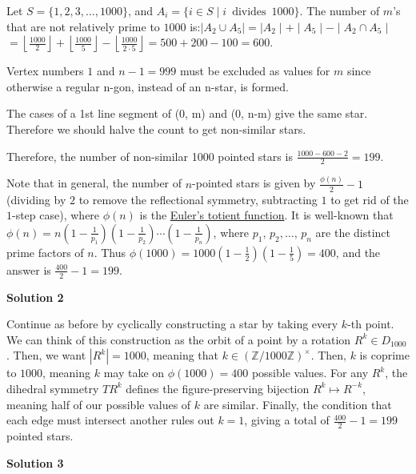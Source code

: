 \begin{enumerate}
 Let $S = \{1,2,3,\ldots, 1000\}$, and $A_{i}= \{i \in S \mid i\, \textrm{ divides }\,1000\}$. The number of $m$'s that are not relatively prime to $1000$ is:$\mid A_{2}\cup A_{5}\mid = \mid A_{2}\mid+\mid A_{5}\mid-\mid A_{2}\cap A_{5}\mid$$= \left\lfloor \frac{1000}{2}\right\rfloor+\left\lfloor \frac{1000}{5}\right\rfloor-\left\lfloor \frac{1000}{2 \cdot 5}\right\rfloor$$= 500+200-100 = 600.$

 Vertex numbers $1$ and $n-1=999$ must be excluded as values for $m$ since otherwise a regular n-gon, instead of an n-star, is formed.

 The cases of a 1st line segment of (0, m) and (0, n-m) give the same star. Therefore we should halve the count to get non-similar stars.

 Therefore, the number of non-similar 1000 pointed stars is $\frac{1000-600-2}{2}= \boxed{199}.$

 Note that in general, the number of $n$-pointed stars is given by $\frac{\phi(n)}{2} - 1$ (dividing by $2$ to remove the reflectional symmetry, subtracting $1$ to get rid of the $1$-step case), where $\phi(n)$ is the \href{https://artofproblemsolving.com/wiki/index.php?title=Euler\%27s\_totient\_function}{Euler's totient function}. It is well-known that $\phi(n) = n\left(1-\frac{1}{p_1}\right)\left(1-\frac{1}{p_2}\right)\cdots \left(1-\frac{1}{p_n}\right)$, where $p_1,\,p_2,\ldots,\,p_n$ are the distinct prime factors of $n$. Thus $\phi(1000) = 1000\left(1 - \frac 12\right)\left(1 - \frac 15\right) = 400$, and the answer is $\frac{400}{2} - 1 = 199$.

 



\textbf{Solution 2}

Continue as before by cyclically constructing a star by taking every $k$-th point. We can think of this construction as the orbit of a point by a rotation $R^k\in D_{1000}$. Then, we want $|R^k|=1000$, meaning that $k\in (\mathbb Z/1000\mathbb Z)^\times$. Then, $k$ is coprime to $1000$, meaning $k$ may take on $\phi(1000)=400$ possible values. For any $R^k$, the dihedral symmetry $TR^k$ defines the figure-preserving bijection $R^k\mapsto R^{-k}$, meaning half of our possible values of $k$ are similar. Finally, the condition that each edge must intersect another rules out $k=1$, giving a total of $\frac{400}2-1=\boxed{199}$ pointed stars.

 



\textbf{Solution 3}


\end{enumerate}
